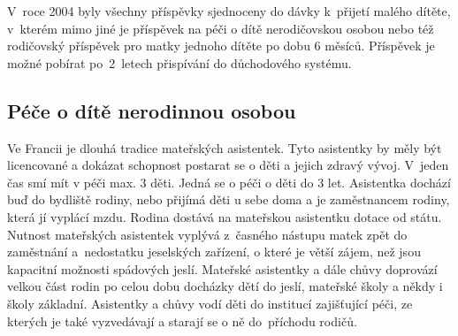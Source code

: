 				V roce 2004 byly všechny příspěvky sjednoceny do dávky k přijetí malého dítěte, v kterém mimo jiné je příspěvek na péči o dítě nerodičovskou osobou nebo též rodičovský příspěvek pro matky jednoho dítěte po dobu 6 měsíců. Příspěvek je možné pobírat po 2 letech přispívání do důchodového systému. \citep{Dennipece}

			\subsection{Péče o dítě nerodinnou osobou}
				Ve Francii je dlouhá tradice mateřských asistentek. Tyto asistentky by měly být licencované a dokázat schopnost postarat se o děti a jejich zdravý vývoj. V jeden čas smí mít v péči max. 3 děti. Jedná se o péči o děti do 3 let. Asistentka dochází buď do bydliště rodiny, nebo přijímá děti u sebe doma a je zaměstnancem rodiny, která jí vyplácí mzdu. Rodina dostává na mateřskou asistentku dotace od státu.
				Nutnost mateřských asistentek vyplývá z časného nástupu matek zpět do zaměstnání a nedostatku jeselských zařízení, o které je větší zájem, než jsou kapacitní možnosti spádových jeslí. Mateřské asistentky a dále chůvy doprovází velkou část rodin po celou dobu docházky dětí do jeslí, mateřské školy a někdy i školy základní. Asistentky a chůvy vodí děti do institucí zajišťující péči, ze kterých je také vyzvedávají a starají se o ně do příchodu rodičů.
